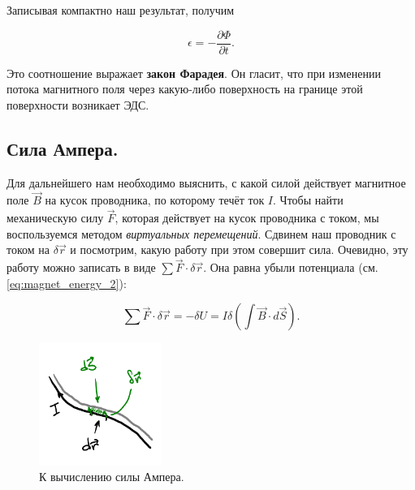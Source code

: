 \documentclass[11pt,a4paper]{article}
\numberwithin{equation}{section}
\newcommand{\pt}{\partial}
\newcommand{\eps}{\epsilon}
\begin{document}
Записывая компактно наш результат, получим

\begin{equation}
  \label{eq:faradays_law}
  \eps = - \frac{\pt \Phi}{\pt t}.
\end{equation}

Это соотношение выражает \textbf{закон Фарадея}. Он гласит, что при
изменении потока магнитного поля через какую-либо поверхность на
границе этой поверхности возникает ЭДС.

\subsection{Сила Ампера.}
\label{sec:amperes_force}

Для дальнейшего нам необходимо выяснить, с какой силой действует
магнитное поле $\vec{B}$ на кусок проводника, по которому течёт ток
$I$. Чтобы найти механическую силу $\vec{F}$, которая действует на
кусок проводника с током, мы воспользуемся методом \textit{виртуальных
  перемещений}. Сдвинем наш проводник с током на $\delta \vec{r}$ и
посмотрим, какую работу при этом совершит сила. Очевидно, эту работу
можно записать в виде $\sum \vec{F} \cdot \delta \vec{r}$. Она равна
убыли потенциала (см. \eqref{eq:magnet_energy_2}):

\begin{equation}
  \label{eq:der_amperes_force_1}
 \sum \vec{F} \cdot \delta \vec{r} = -\delta U = I \delta \left( \int \vec{B}  \cdot d\vec{S}\right). 
\end{equation}

\begin{figure}
  \vspace{-1.5cm}
  \begin{center}
  \includegraphics[width=4cm]{ampere.pdf}  
  \end{center}
  \vspace{-1cm}
  \caption{К вычислению силы Ампера.}
  \label{fig:amperes_force}
  \vspace{-1.1cm}
\end{figure}
\end{document}
